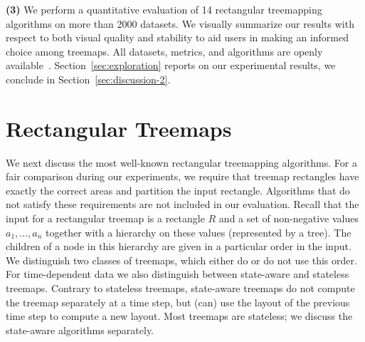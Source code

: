 \noindent
\textbf{(3)} We perform a quantitative evaluation of 14 rectangular treemapping algorithms on more than 2000 datasets. We visually summarize our results with respect to both visual quality and stability to aid users in making an informed choice among treemaps. All datasets, metrics, and algorithms are openly available~\citep{URLTreemaps}. Section~\ref{sec:exploration} reports on our experimental results, we conclude in Section~\ref{sec:discussion-2}.


\section{Rectangular Treemaps}
\label{sec:algorithms-2}
We next discuss the most well-known rectangular treemapping algorithms. For a fair comparison during our experiments, we require that treemap rectangles have exactly the correct areas and partition the input rectangle. Algorithms that do not satisfy these requirements are not included in our evaluation. 
%
 Recall that the input for a rectangular treemap is a rectangle $R$ and a set of non-negative values $a_1, \ldots, a_n$ together with a hierarchy on these values (represented by a tree). The children of a node in this hierarchy are given in a particular order in the input. We distinguish two classes of treemaps, which either do or do not use this order. For time-dependent data we also distinguish between state-aware and stateless treemaps. Contrary to stateless treemaps, state-aware treemaps do not compute the treemap separately at a time step, but (can) use the layout of the previous time step to compute a new layout. Most treemaps are stateless; we discuss the state-aware algorithms separately. 

